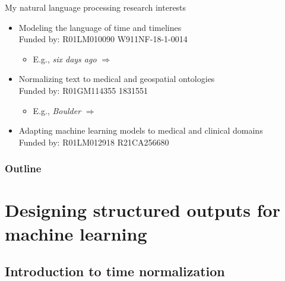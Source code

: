 \documentclass[14pt,aspectratio=169]{beamer}
\newcommand{\raisegraphics}[3]{\raisebox{-#1\height}{\texttt{[image: \#3]}}}
\newcommand{\funding}[2]{\raisegraphics{.2}{height=.05\textheight}{#1} #2}
\begin{document}
\begin{frame}{My natural language processing research interests}
\begin{itemize}
\item Modeling the language of time and timelines \\
{\footnotesize Funded by:
\funding{funding/nih_nlm.png}{R01LM010090}
\quad\funding{funding/darpa.png}{W911NF-18-1-0014}}
\begin{itemize}
\item E.g., \textit{six days ago} $\Rightarrow$ \raisegraphics{.4}{height=.15\textheight}{calendar/2024-02-07.png}
\end{itemize}

\bigskip
\item Normalizing text to medical and geospatial ontologies \\
{\footnotesize Funded by:
\funding{funding/nih_nigms.jpg}{R01GM114355}
\quad\funding{funding/nsf.png}{1831551}}
\begin{itemize}
\item E.g., \textit{Boulder} $\Rightarrow$ \raisegraphics{.4}{height=.15\textheight}{geonames/BoulderUSCOP.png}
\end{itemize}

\bigskip
\item Adapting machine learning models to medical and clinical domains \\
{\footnotesize Funded by:
\funding{funding/nih_nlm.png}{R01LM012918}
\quad\funding{funding/nih_nci.jpg}{R21CA256680}}
\end{itemize}
\end{frame}


\begin{frame}
    \frametitle{Outline}
    \tableofcontents
\end{frame}

\section{Designing structured outputs for machine learning}

\subsection{Introduction to time normalization}
\end{document}

